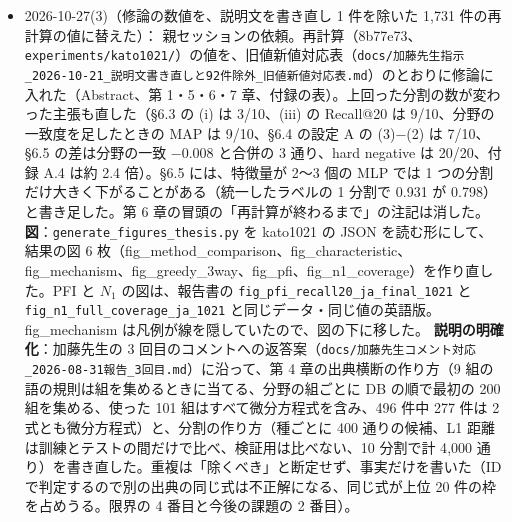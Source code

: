\documentclass[11pt,a4paper]{jsarticle}
\begin{document}
\begin{itemize}[nosep]
    \textbf{中身}：3 節に、LLM に渡すもの（ID、式の表記、分野ラベルだけの全 11{,}146 式と、テストケース 1 件のクエリ。出典は渡さず、式の並びと ID を振り直す。解いた例は渡さない）とその理由、各手法が使う情報の表、ID による判定と Recall@20・MAP@20 の式、比べ方（提案手法と同じ 10 通りの分割で、何通りで上回ったか）、呼び出しの回数（異なるテストケースごとに 1 回で 1{,}673 回）、比べる相手の値（\texttt{experiments/kato1021/main.json}。全ケースの Recall@20 は baseline 0.906 と提案手法 0.981、MAP@20 は 0.680 と 0.857）、費用の内訳（\texttt{experiments/llm\_db\_baseline/token\_counts\_v3.json}。1 モデル 89〜583 ドルで、68〜90\% はデータベースの読み出し）を書いた。Appendix には、指示文（版 3）、呼び出しの設定と記録、費用の見積もりの式と料金を置いた。
    料金は、Anthropic の料金表で確かめ直した（2026-11-01）。Claude Sonnet 5.5 のキャッシュの読み出しは 100 万トークンあたり 0.10 ドル（入力の 0.05 倍）で、\texttt{run\_llm\_db\_baseline.py} の値と一致した。有料の呼び出しはしていない。試験 59 件は通る。
  \item 2026-10-27(3)（修論の数値を、説明文を書き直し 1 件を除いた 1{,}731 件の再計算の値に替えた）：
    親セッションの依頼。再計算（8b77e73、\texttt{experiments/kato1021/}）の値を、旧値新値対応表（\texttt{docs/加藤先生指示\_2026-10-21\_説明文書き直しと92件除外\_旧値新値対応表.md}）のとおりに修論に入れた（Abstract、第 1・5・6・7 章、付録の表）。上回った分割の数が変わった主張も直した（\S 6.3 の (i) は 3/10、(iii) の Recall@20 は 9/10、分野の一致度を足したときの MAP は 9/10、\S 6.4 の設定 A の (3)$-$(2) は 7/10、\S 6.5 の差は分野の一致 $-0.008$ と合併の 3 通り、hard negative は 20/20、付録 A.4 は約 2.4 倍）。\S 6.5 には、特徴量が 2〜3 個の MLP では 1 つの分割だけ大きく下がることがある（統一したラベルの 1 分割で 0.931 が 0.798）と書き足した。第 6 章の冒頭の「再計算が終わるまで」の注記は消した。
    \textbf{図}：\texttt{generate\_figures\_thesis.py} を kato1021 の JSON を読む形にして、結果の図 6 枚（fig\_method\_comparison、fig\_characteristic、fig\_mechanism、fig\_greedy\_3way、fig\_pfi、fig\_n1\_coverage）を作り直した。PFI と $N_1$ の図は、報告書の \texttt{fig\_pfi\_recall20\_ja\_final\_1021} と \texttt{fig\_n1\_full\_coverage\_ja\_1021} と同じデータ・同じ値の英語版。fig\_mechanism は凡例が線を隠していたので、図の下に移した。
    \textbf{説明の明確化}：加藤先生の 3 回目のコメントへの返答案（\texttt{docs/加藤先生コメント対応\_2026-08-31報告\_3回目.md}）に沿って、第 4 章の出典横断の作り方（9 組の語の規則は組を集めるときに当てる、分野の組ごとに DB の順で最初の 200 組を集める、使った 101 組はすべて微分方程式を含み、496 件中 277 件は 2 式とも微分方程式）と、分割の作り方（種ごとに 400 通りの候補、L1 距離は訓練とテストの間だけで比べ、検証用は比べない、10 分割で計 4{,}000 通り）を書き直した。重複は「除くべき」と断定せず、事実だけを書いた（ID で判定するので別の出典の同じ式は不正解になる、同じ式が上位 20 件の枠を占めうる。限界の 4 番目と今後の課題の 2 番目）。

\end{itemize}
\end{document}
